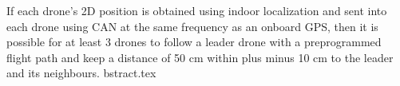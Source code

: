 If each drone’s 2D position is obtained using indoor localization and sent into each drone using CAN at the same frequency as an onboard GPS, then it is possible for at least 3 drones to follow a leader drone with a preprogrammed flight path and keep a distance of 50 cm within plus minus 10 cm to the leader and its neighbours.
bstract.tex
